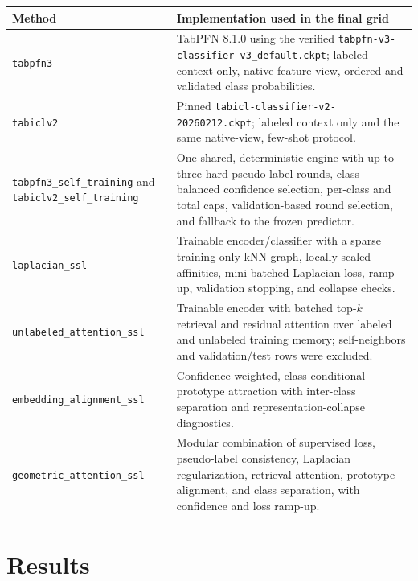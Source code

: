 \documentclass[10pt]{article}
\newcommand{\method}[1]{\texttt{\small #1}}
\begin{document}
\small
\begin{tabularx}{\textwidth}{@{}p{40mm}Y@{}}
\toprule
\textbf{Method} & \textbf{Implementation used in the final grid}\\
\midrule
\method{tabpfn3} &
TabPFN 8.1.0 using the verified
\method{tabpfn-v3-classifier-v3\_default.ckpt}; labeled context only, native
feature view, ordered and validated class probabilities.\\
\method{tabiclv2} &
Pinned \method{tabicl-classifier-v2-20260212.ckpt}; labeled context only and
the same native-view, few-shot protocol.\\
\method{tabpfn3\_self\_training} and
\method{tabiclv2\_self\_training} &
One shared, deterministic engine with up to three hard pseudo-label rounds,
class-balanced confidence selection, per-class and total caps, validation-based
round selection, and fallback to the frozen predictor.\\
\method{laplacian\_ssl} &
Trainable encoder/classifier with a sparse training-only kNN graph, locally
scaled affinities, mini-batched Laplacian loss, ramp-up, validation stopping,
and collapse checks.\\
\method{unlabeled\_attention\_ssl} &
Trainable encoder with batched top-\(k\) retrieval and residual attention over
labeled and unlabeled training memory; self-neighbors and validation/test rows
were excluded.\\
\method{embedding\_alignment\_ssl} &
Confidence-weighted, class-conditional prototype attraction with inter-class
separation and representation-collapse diagnostics.\\
\method{geometric\_attention\_ssl} &
Modular combination of supervised loss, pseudo-label consistency, Laplacian
regularization, retrieval attention, prototype alignment, and class separation,
with confidence and loss ramp-up.\\
\bottomrule
\end{tabularx}
\normalsize

\newpage

\section{Results}
\end{document}
